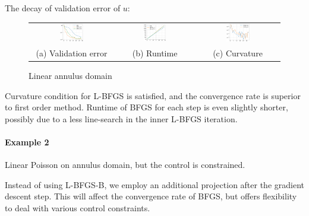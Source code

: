 \documentclass{article}
\begin{document}
The decay of validation error of $u$:
\begin{figure}[hbt]
    \centering
    \begin{tabular}{ccc}
    \includegraphics[width=0.3\textwidth]{figures/linear.png}
    &\includegraphics[width=0.3\textwidth]{figures/linear_time.png}
    &\includegraphics[width=0.3\textwidth]{figures/linear_curvcon.png} \\ 
    (a) Validation error & (b) Runtime & (c) Curvature
    \end{tabular}
    \caption{Linear annulus domain}
\label{fig:annulus_loss}
\end{figure}
Curvature condition for L-BFGS is satisfied, and the convergence rate is superior to first order method. Runtime of BFGS for each step is even slightly shorter, possibly due to a less line-search in the inner L-BFGS iteration. 

\paragraph*{Example 2} Linear Poisson on annulus domain, but the control is constrained.

Instead of using L-BFGS-B, we employ an additional projection after the gradient descent step. This will affect the convergence rate of BFGS, but offers flexibility to deal with various control constraints. 
\end{document}
